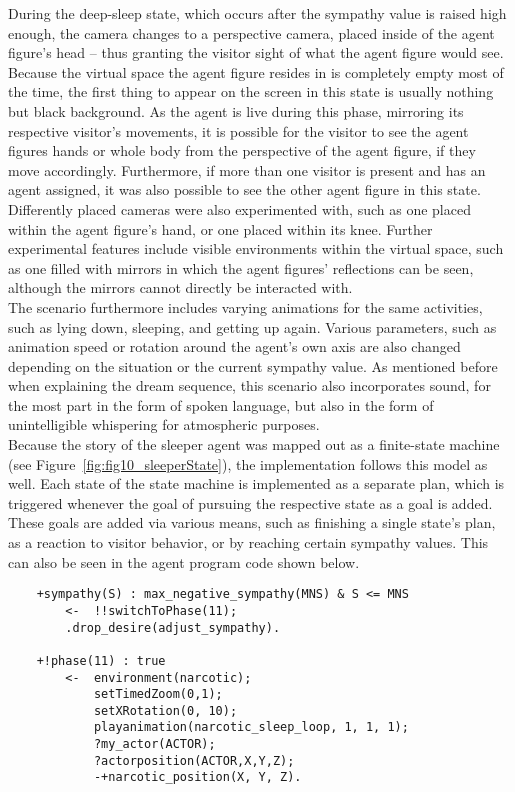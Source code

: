 \documentclass[draft,final]{vutinfth} %
\begin{document}
During the deep-sleep state, which occurs after the sympathy value is raised high enough, the camera changes to a perspective camera, placed inside of the agent figure’s head – thus granting the visitor sight of what the agent figure would see. 
Because the virtual space the agent figure resides in is completely empty most of the time, the first thing to appear on the screen in this state is usually nothing but black background. 
As the agent is live during this phase, mirroring its respective visitor’s movements, it is possible for the visitor to see the agent figures hands or whole body from the perspective of the agent figure, if they move accordingly. 
Furthermore, if more than one visitor is present and has an agent assigned, it was also possible to see the other agent figure in this state. 
Differently placed cameras were also experimented with, such as one placed within the agent figure’s hand, or one placed within its knee. 
Further experimental features include visible environments within the virtual space, such as one filled with mirrors in which the agent figures’ reflections can be seen, although the mirrors cannot directly be interacted with. \\
The scenario furthermore includes varying animations for the same activities, such as lying down, sleeping, and getting up again.
Various parameters, such as animation speed or rotation around the agent’s own axis are also changed depending on the situation or the current sympathy value. 
As mentioned before when explaining the dream sequence, this scenario also incorporates sound, for the most part in the form of spoken language, but also in the form of unintelligible whispering for atmospheric purposes. \\
Because the story of the sleeper agent was mapped out as a finite-state machine (see Figure~\ref{fig:fig10_sleeperState}), the implementation follows this model as well. 
Each state of the state machine is implemented as a separate plan, which is triggered whenever the goal of pursuing the respective state as a goal is added. 
These goals are added via various means, such as finishing a single state’s plan, as a reaction to visitor behavior, or by reaching certain sympathy values. 
This can also be seen in the agent program code shown below. 
\begin{verbatim}
    +sympathy(S) : max_negative_sympathy(MNS) & S <= MNS
        <-  !!switchToPhase(11);    
        .drop_desire(adjust_sympathy).

    +!phase(11) : true
        <-  environment(narcotic);
            setTimedZoom(0,1);
            setXRotation(0, 10);
            playanimation(narcotic_sleep_loop, 1, 1, 1);
            ?my_actor(ACTOR);
            ?actorposition(ACTOR,X,Y,Z);
            -+narcotic_position(X, Y, Z).
\end{verbatim}
\end{document}
